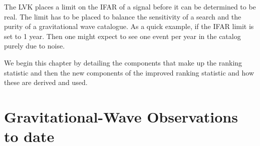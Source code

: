 The LVK places a limit on the IFAR of a signal before it can be determined to be real. The limit has to be placed to balance the sensitivity of a search and the purity of a gravitational wave catalogue. As a quick example, if the IFAR limit is set to 1 year. Then one might expect to see one event per year in the catalog purely due to noise.

We begin this chapter by detailing the components that make up the ranking statistic and then the new components of the improved ranking statistic and how these are derived and used.

\section{\label{2:sec:current-detections}Gravitational-Wave Observations to date}
